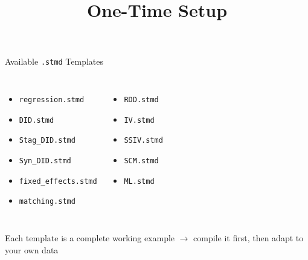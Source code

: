 \documentclass[dvipsnames,hyperref={pdfpagelabels=false}]{beamer}
\begin{document}
\begin{frame}{Available \texttt{.stmd} Templates}
  \begin{columns}[t]
    \begin{itemize}
      \item \texttt{regression.stmd}
      \item \texttt{DID.stmd}
      \item \texttt{Stag\_DID.stmd}
      \item \texttt{Syn\_DID.stmd}
      \item \texttt{fixed\_effects.stmd}
      \item \texttt{matching.stmd}
    \end{itemize}

    \begin{itemize}
      \item \texttt{RDD.stmd}
      \item \texttt{IV.stmd}
      \item \texttt{SSIV.stmd}
      \item \texttt{SCM.stmd}
      \item \texttt{ML.stmd}
    \end{itemize}
  \end{columns}

  \vspace{1em}
  \begin{center}
    \alert{Each template is a complete working example $\to$ compile it first,
    then adapt to your own data}
  \end{center}
\end{frame}

\title[]{One-Time Setup}
\author{}\institute{}\date{}
\begin{frame}{}
  \titlepage
\end{frame}
\end{document}

